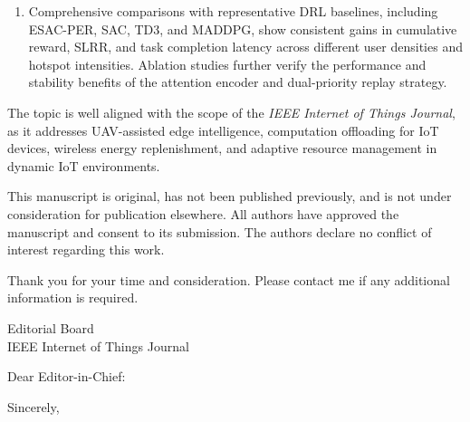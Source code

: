 \documentclass[10pt]{letter}
\begin{document}
{\begin{enumerate}
\item Comprehensive comparisons with representative DRL baselines, including
ESAC-PER, SAC, TD3, and MADDPG, show consistent gains in cumulative reward,
SLRR, and task completion latency across different user densities and hotspot
intensities. Ablation studies further verify the performance and stability
benefits of the attention encoder and dual-priority replay strategy.
\end{enumerate}

The topic is well aligned with the scope of the \textit{IEEE Internet of Things
Journal}, as it addresses UAV-assisted edge intelligence, computation
offloading for IoT devices, wireless energy replenishment, and adaptive
resource management in dynamic IoT environments.

This manuscript is original, has not been published previously, and is not
under consideration for publication elsewhere. All authors have approved the
manuscript and consent to its submission. The authors declare no conflict of
interest regarding this work.

Thank you for your time and consideration. Please contact me if any additional
information is required.
}


\begin{letter}{Editorial Board\\
               IEEE Internet of Things Journal}
\opening{Dear Editor-in-Chief:} \body
\closing{Sincerely,}
\end{letter}
\end{document}
